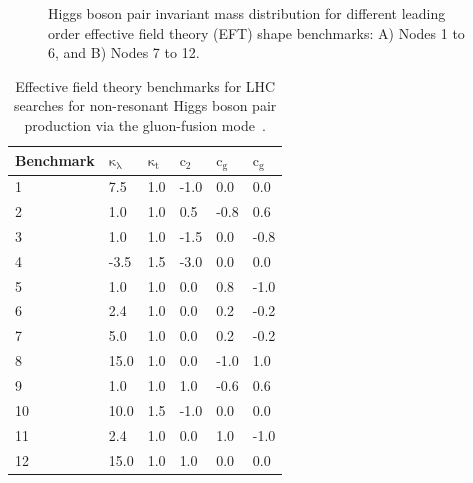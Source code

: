\begin{figure}[ht]
\centering
\captionsetup[subfigure]{justification=centering}
\caption{Higgs boson pair invariant mass distribution for different leading order effective field theory (EFT) shape benchmarks: A) Nodes 1 to 6, and B) Nodes 7 to 12.}
\label{fig:eftshapes}
\end{figure}

\begin{table}[ht]
\centering
\caption[Effective field theory benchmarks for LHC searches for non-resonant Higgs boson pair production]{\label{tab:eftcouplings} Effective field theory benchmarks for LHC searches for non-resonant Higgs boson pair production via the gluon-fusion mode~\cite{Carvalho:2015ttv}.}
\begin{tabularx}{\textwidth}{XXXXXX}
\hline
Benchmark  & $\mathrm{\kappa_{\lambda}}$ &  $\mathrm{\kappa_{t}}$ &   $\mathrm{c_{2}}$ & $\mathrm{c_{g}}$  & $\mathrm{c_{g}}$ \\
\hline
1   &7.5   & 1.0  & -1.0 &  0.0 & 0.0  \\[0pt]
2   &1.0   & 1.0  &  0.5 & -0.8 & 0.6  \\[0pt]
3   &1.0   & 1.0  & -1.5 &  0.0 &-0.8  \\[0pt]
4   &-3.5  & 1.5  & -3.0 &  0.0 & 0.0  \\[0pt]
5   &1.0   & 1.0  &  0.0 &  0.8 &-1.0  \\[0pt]
6   &2.4   & 1.0  &  0.0 &  0.2 &-0.2  \\[0pt]
7   &5.0   & 1.0  &  0.0 &  0.2 &-0.2  \\[0pt]
8   &15.0  & 1.0  &  0.0 & -1.0 & 1.0  \\[0pt]
9   &1.0   & 1.0  &  1.0 & -0.6 & 0.6  \\[0pt]
10  &10.0  & 1.5  & -1.0 &  0.0 & 0.0  \\[0pt]
11  &2.4   & 1.0  &  0.0 &  1.0 &-1.0  \\[0pt]
12  &15.0  & 1.0  &  1.0 &  0.0 & 0.0  \\[0pt]
\hline
\end{tabularx}
\end{table}


